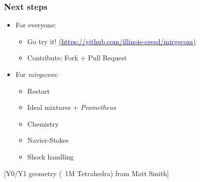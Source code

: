 \begin{frame}\frametitle{Next steps}
\begin{multicols}{2}
\begin{itemize}
\item For everyone:
\begin{itemize}
\item Go try it! \href{https://github.com/illinois-ceesd/mirgecom}{(\textcolor{blue}{https://github.com/illinois-ceesd/mirgecom})}
\item Contribute: Fork + Pull Request 
\end{itemize}
\item For \textit{mirgecom}:
\begin{itemize}
\item Restart
\item Ideal mixtures + \textit{Prometheus}
\item Chemistry
\item Navier-Stokes
\item Shock handling
\end{itemize}
\end{itemize}

\end{multicols}
  \fi
  \begin{center}
  [Y0/Y1 geometry (~1M Tetrahedra) from Matt Smith]
  \end{center}
\end{frame}


